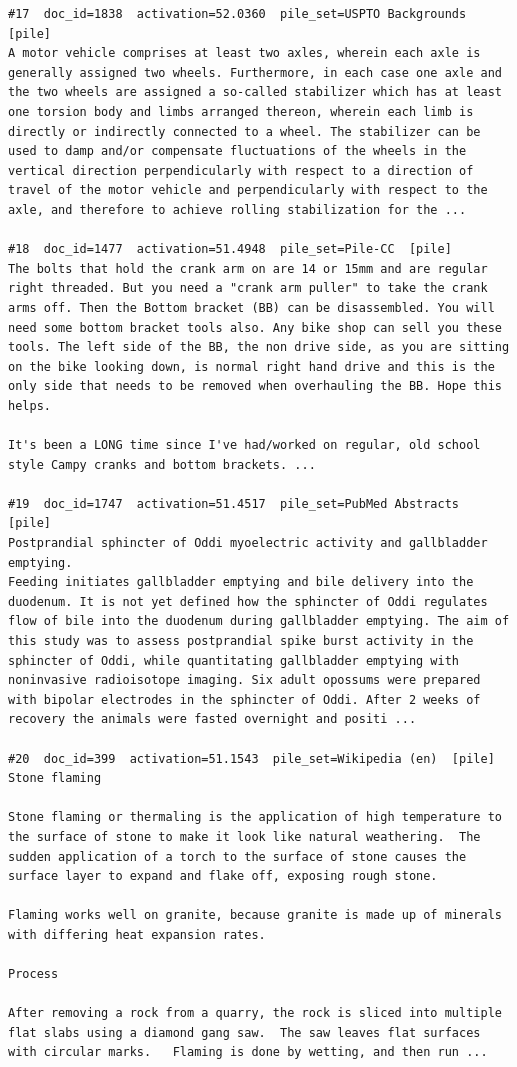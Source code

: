 \begin{verbatim}
#17  doc_id=1838  activation=52.0360  pile_set=USPTO Backgrounds  [pile]
A motor vehicle comprises at least two axles, wherein each axle is generally assigned two wheels. Furthermore, in each case one axle and the two wheels are assigned a so-called stabilizer which has at least one torsion body and limbs arranged thereon, wherein each limb is directly or indirectly connected to a wheel. The stabilizer can be used to damp and/or compensate fluctuations of the wheels in the vertical direction perpendicularly with respect to a direction of travel of the motor vehicle and perpendicularly with respect to the axle, and therefore to achieve rolling stabilization for the ...

#18  doc_id=1477  activation=51.4948  pile_set=Pile-CC  [pile]
The bolts that hold the crank arm on are 14 or 15mm and are regular right threaded. But you need a "crank arm puller" to take the crank arms off. Then the Bottom bracket (BB) can be disassembled. You will need some bottom bracket tools also. Any bike shop can sell you these tools. The left side of the BB, the non drive side, as you are sitting on the bike looking down, is normal right hand drive and this is the only side that needs to be removed when overhauling the BB. Hope this helps.

It's been a LONG time since I've had/worked on regular, old school style Campy cranks and bottom brackets. ...

#19  doc_id=1747  activation=51.4517  pile_set=PubMed Abstracts  [pile]
Postprandial sphincter of Oddi myoelectric activity and gallbladder emptying.
Feeding initiates gallbladder emptying and bile delivery into the duodenum. It is not yet defined how the sphincter of Oddi regulates flow of bile into the duodenum during gallbladder emptying. The aim of this study was to assess postprandial spike burst activity in the sphincter of Oddi, while quantitating gallbladder emptying with noninvasive radioisotope imaging. Six adult opossums were prepared with bipolar electrodes in the sphincter of Oddi. After 2 weeks of recovery the animals were fasted overnight and positi ...

#20  doc_id=399  activation=51.1543  pile_set=Wikipedia (en)  [pile]
Stone flaming

Stone flaming or thermaling is the application of high temperature to the surface of stone to make it look like natural weathering.  The sudden application of a torch to the surface of stone causes the surface layer to expand and flake off, exposing rough stone.    

Flaming works well on granite, because granite is made up of minerals with differing heat expansion rates.

Process

After removing a rock from a quarry, the rock is sliced into multiple flat slabs using a diamond gang saw.  The saw leaves flat surfaces with circular marks.   Flaming is done by wetting, and then run ...

\end{verbatim}

